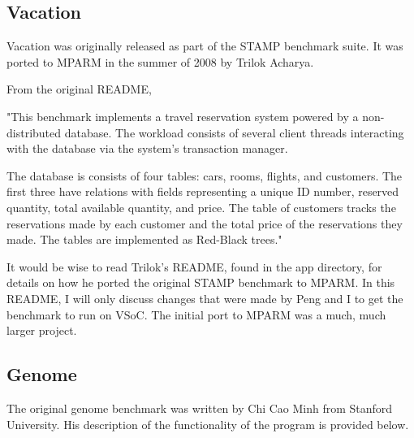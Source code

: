 \documentclass{article}
\begin{document}
\subsection{Vacation}

Vacation was originally released as part of the STAMP benchmark suite. It was
ported to MPARM in the summer of 2008 by Trilok Acharya.

From the original README, 

	"This benchmark implements a travel reservation system powered by a
	non-distributed database. The workload consists of several client threads
	interacting with the database via the system's transaction manager.

	The database is consists of four tables: cars, rooms, flights, and 
	customers. The first three have relations with fields representing a 
	unique ID number, reserved quantity, total available quantity, and price. 
	The table of customers tracks the reservations made by each customer and 
	the total price of the reservations they made. The tables are implemented 
	as Red-Black trees."

It would be wise to read Trilok's README, found in the app directory, for 
details on how he ported the original STAMP benchmark to MPARM. In this README,
I will only discuss changes that were made by Peng and I to get the benchmark
to run on VSoC. The initial port to MPARM was a much, much larger project. 

\subsection{Genome}

The original genome benchmark was written by Chi Cao Minh from Stanford 
University. His description of the functionality of the program is provided 
below.
\end{document}
